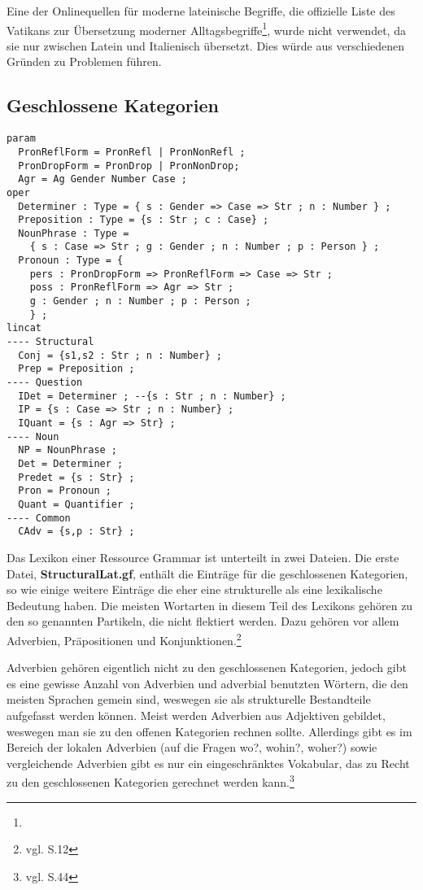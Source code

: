 Eine der Onlinequellen für moderne lateinische Begriffe, die offizielle Liste des Vatikans zur Übersetzung moderner Alltagsbegriffe\footnote{\vatlatinitas}, wurde nicht verwendet, da sie nur zwischen Latein und Italienisch übersetzt. Dies würde aus verschiedenen Gründen zu Problemen führen.
\subsection{Geschlossene Kategorien}
\label{subsec:geschlossene}
\begin{lstlisting}[float=h!,caption={Für \textbf{StructuralLat.gf} nötige \texttt{lincat}-Definitionen für geschlossene Kategorien},label={GF-Structural-Lincat},basicstyle=\small]
param
  PronReflForm = PronRefl | PronNonRefl ;
  PronDropForm = PronDrop | PronNonDrop;
  Agr = Ag Gender Number Case ;
oper
  Determiner : Type = { s : Gender => Case => Str ; n : Number } ;
  Preposition : Type = {s : Str ; c : Case} ;
  NounPhrase : Type = 
    { s : Case => Str ; g : Gender ; n : Number ; p : Person } ;
  Pronoun : Type = {
    pers : PronDropForm => PronReflForm => Case => Str ;
    poss : PronReflForm => Agr => Str ;
    g : Gender ; n : Number ; p : Person ;
    } ;
lincat
---- Structural
  Conj = {s1,s2 : Str ; n : Number} ;
  Prep = Preposition ;
---- Question
  IDet = Determiner ; --{s : Str ; n : Number} ;
  IP = {s : Case => Str ; n : Number} ;
  IQuant = {s : Agr => Str} ;
---- Noun
  NP = NounPhrase ;
  Det = Determiner ;
  Predet = {s : Str} ;
  Pron = Pronoun ;
  Quant = Quantifier ;
---- Common
  CAdv = {s,p : Str} ; 
\end{lstlisting}
Das Lexikon einer Ressource Grammar ist unterteilt in zwei Dateien. Die erste Datei, \textbf{StructuralLat.gf}, enthält die Einträge für die geschlossenen Kategorien, so wie einige weitere Einträge die eher eine strukturelle als eine lexikalische Bedeutung haben. Die meisten Wortarten in diesem Teil des Lexikons gehören zu den so genannten Partikeln, die nicht flektiert werden. Dazu gehören vor allem Adverbien, Präpositionen und Konjunktionen.\footnote{vgl. \cite{BAYER-LINDAUER1994} S.12} \par
Adverbien gehören eigentlich nicht zu den geschlossenen Kategorien, jedoch gibt es eine gewisse Anzahl von Adverbien und adverbial benutzten Wörtern, die den meisten Sprachen gemein sind, weswegen sie als strukturelle Bestandteile aufgefasst werden können. Meist werden Adverbien aus Adjektiven gebildet, weswegen man sie zu den offenen Kategorien rechnen sollte. Allerdings gibt es im  Bereich der lokalen Adverbien (auf die Fragen wo?, wohin?, woher?) sowie vergleichende Adverbien gibt es nur ein eingeschränktes Vokabular, das zu Recht zu den geschlossenen Kategorien gerechnet werden kann.\footnote{vgl. \cite{BAYER-LINDAUER1994} S.44} 
